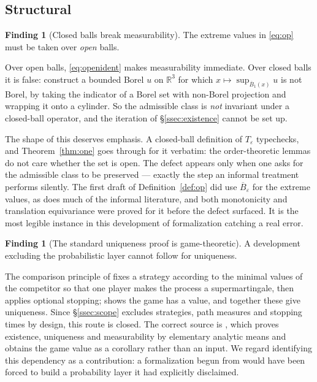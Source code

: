 \documentclass[11pt,reqno]{amsart}
\newcommand{\R}{\mathbb{R}}
\newcommand{\eps}{\varepsilon}
\newcommand{\Op}{T_\eps}
\theoremstyle{plain}
\theoremstyle{definition}
\newtheorem{finding}[theorem]{Finding}
\begin{document}
\subsection{Structural}

\begin{finding}[Closed balls break measurability]\label{find:closedball}
The extreme values in \eqref{eq:op} must be taken over \emph{open} balls.
\end{finding}

Over open balls, \eqref{eq:openident} makes measurability immediate. Over
closed balls it is false: \cite[Example 2.4]{LPS14} construct a bounded Borel
$u$ on $\R^3$ for which $x \mapsto \sup_{\overline{B}_1(x)} u$ is not Borel, by
taking the indicator of a Borel set with non-Borel projection and wrapping it
onto a cylinder. So the admissible class is \emph{not} invariant under a
closed-ball operator, and the iteration of \S\ref{ssec:existence} cannot be set
up.

The shape of this deserves emphasis. A closed-ball definition of $\Op$
typechecks, and Theorem~\ref{thm:one} goes through for it verbatim: the
order-theoretic lemmas do not care whether the set is open. The defect appears
only when one asks for the admissible class to be preserved --- exactly the
step an informal treatment performs silently.
The first draft of Definition~\ref{def:op} did use $\overline{B}_\eps$ for the
extreme values, as does much of the informal literature, and both monotonicity
and translation equivariance were proved for it before the defect surfaced. It
is the most legible instance in this development of formalization catching a
real error.

\begin{finding}[The standard uniqueness proof is
game-theoretic]\label{find:mpr}
A development excluding the probabilistic layer cannot follow \cite{MPR12} for
uniqueness.
\end{finding}

The comparison principle of \cite[Thm.~2.3]{MPR12} fixes a strategy according
to the minimal values of the competitor so that one player makes the process a
supermartingale, then applies optional stopping; \cite[Thm.~2.4]{MPR12} shows
the game has a value, and together these give uniqueness. Since
\S\ref{ssec:scope} excludes strategies, path measures and stopping times by
design, this route is closed. The correct source is \cite{LPS14}, which proves
existence, uniqueness and measurability by elementary analytic means and
obtains the game value as a corollary rather than an input. We regard
identifying this dependency as a contribution: a formalization begun from
\cite{MPR12} would have been forced to build a probability layer it had
explicitly disclaimed.
\end{document}
